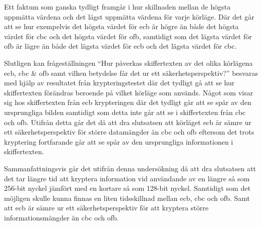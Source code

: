 Ett faktum som ganska tydligt framgår i hur skillnaden mellan de högsta uppmätta värdena och det lägst uppmätta värdena för varje körläge. Där det går att se hur
exempelvis det högsta värdet för \acrshort{ecb} är högre än både det högsta värdet för \acrshort{cbc} och det högsta värdet för \acrshort{ofb}, samtidigt som det lägsta värdet för
\acrshort{ofb} är lägre än både det lägsta värdet för \acrshort{ecb} och det lägsta värdet för \acrshort{cbc}.

Slutligen kan frågeställningen “Hur påverkas skiffertexten av det olika körlägena \acrshort{ecb}, \acrshort{cbc} \& \acrshort{ofb} samt vilken betydelse får det ur ett säkerhetsperspektiv?”
besvaras med hjälp av resultatet från krypteringstestet där det tydligt gå att se hur skiffertexten förändras beroende på vilket körläge som används. Något som visar sig hos skiffertexten
från \acrshort{ecb} krypteringen där det tydligt går att se spår av den ursprungliga bilden samtidigt som detta inte går att se i skiffertexten från \acrshort{cbc} och \acrshort{ofb}. Utifrån detta går det då att dra slutsatsen
att körläget \acrshort{ecb} är sämre ur ett säkerhetsperspektiv för större datamängder än \acrshort{cbc} och \acrshort{ofb} eftersom det trots kryptering fortfarande går att se spår av den ursprungliga
informationen i skiffertexten.

Sammanfattningsvis går det utifrån denna undersökning då att dra slutsatsen att det tar längre tid att kryptera information vid användande av en längre så som 256-bit nyckel jämfört med en kortare så som 128-bit nyckel. Samtidigt
som det möjligen skulle kunna finnas en liten tidsskillnad mellan \acrshort{ecb}, \acrshort{cbc} och \acrshort{ofb}. Samt att \acrshort{ecb} är sämre ur ett säkerhetsperspektiv för att kryptera större informationsmängder än
\acrshort{cbc} och \acrshort{ofb}.

